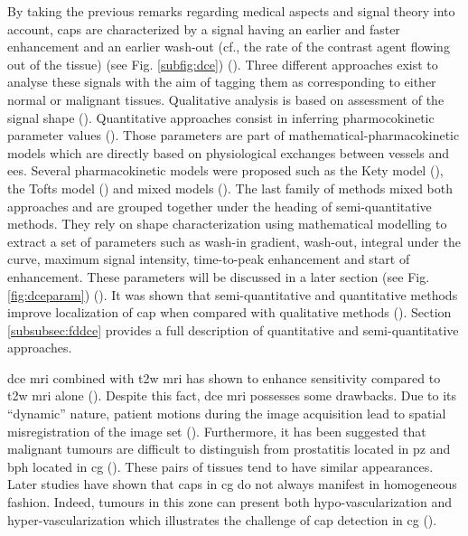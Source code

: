 \begin{enumerate}[leftmargin=*]
By taking the previous remarks regarding medical aspects and signal theory into account, \acp{cap} are characterized by a signal having an earlier and faster enhancement and an earlier wash-out (cf., the rate of the contrast agent flowing out of the tissue) (see Fig. \ref{subfig:dce}) (\cite{Verma2012}). Three different approaches exist to analyse these signals with the aim of tagging them as corresponding to either normal or malignant tissues. Qualitative analysis is based on assessment of the signal shape (\cite{Hoeks2011}). Quantitative approaches consist in inferring pharmocokinetic parameter values (\cite{Tofts2010}). Those parameters are part of mathematical-pharmacokinetic models which are directly based on physiological exchanges between vessels and \ac{ees}. Several pharmacokinetic models were proposed such as the Kety model (\cite{Kety1951}), the Tofts model (\cite{Tofts1997}) and mixed models (\cite{Larsson1996,StLawrence1998}). The last family of methods mixed both approaches and are grouped together under the heading of semi-quantitative methods. They rely on shape characterization using mathematical modelling to extract a set of parameters such as wash-in gradient, wash-out, integral under the curve, maximum signal intensity, time-to-peak enhancement and start of enhancement. These parameters will be discussed in a later section (see Fig. \ref{fig:dceparam}) (\cite{Hoeks2011,Verma2012}). It was shown that semi-quantitative and quantitative methods improve localization of \ac{cap} when compared with qualitative methods (\cite{Rosenkrantz2013}). Section \ref{subsubsec:fddce} provides a full description of quantitative and semi-quantitative approaches.

\ac{dce} \ac{mri} combined with \ac{t2w} \ac{mri} has shown to enhance sensitivity compared to \ac{t2w} \ac{mri} alone (\cite{Jager1997,Kim2005,Schlemmer2004,Zelhof2009}). Despite this fact, \ac{dce} \ac{mri} possesses some drawbacks. Due to its ``dynamic'' nature, patient motions during the image acquisition lead to spatial misregistration of the image set (\cite{Verma2012}). Furthermore, it has been suggested that malignant tumours are difficult to distinguish from prostatitis located in \ac{pz} and \ac{bph} located in \ac{cg} (\cite{Hoeks2011,Verma2012}). These pairs of tissues tend to have similar appearances. Later studies have shown that \acp{cap} in \ac{cg} do not always manifest in homogeneous fashion. Indeed, tumours in this zone can present both hypo-vascularization and hyper-vascularization which illustrates the challenge of \ac{cap} detection in \ac{cg} (\cite{Niekerk2013}).


\end{enumerate}
